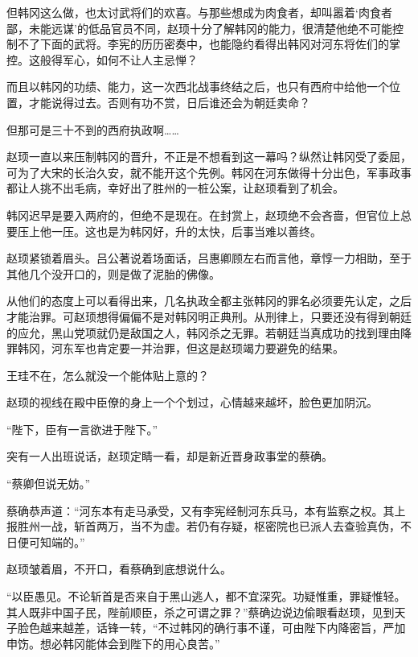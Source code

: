 但韩冈这么做，也太讨武将们的欢喜。与那些想成为肉食者，却叫嚣着‘肉食者鄙，未能远谋’的低品官员不同，赵顼十分了解韩冈的能力，很清楚他绝不可能控制不了下面的武将。李宪的历历密奏中，也能隐约看得出韩冈对河东将佐们的掌控。这般得军心，如何不让人主忌惮？

而且以韩冈的功绩、能力，这一次西北战事终结之后，也只有西府中给他一个位置，才能说得过去。否则有功不赏，日后谁还会为朝廷卖命？

但那可是三十不到的西府执政啊……

赵顼一直以来压制韩冈的晋升，不正是不想看到这一幕吗？纵然让韩冈受了委屈，可为了大宋的长治久安，就不能开这个先例。韩冈在河东做得十分出色，军事政事都让人挑不出毛病，幸好出了胜州的一桩公案，让赵顼看到了机会。

韩冈迟早是要入两府的，但绝不是现在。在封赏上，赵顼绝不会吝啬，但官位上总要压上他一压。这也是为韩冈好，升的太快，后事当难以善终。

赵顼紧锁着眉头。吕公著说着场面话，吕惠卿顾左右而言他，章惇一力相助，至于其他几个没开口的，则是做了泥胎的佛像。

从他们的态度上可以看得出来，几名执政全都主张韩冈的罪名必须要先认定，之后才能治罪。可赵顼想得偏偏不是对韩冈明正典刑。从刑律上，只要还没有得到朝廷的应允，黑山党项就仍是敌国之人，韩冈杀之无罪。若朝廷当真成功的找到理由降罪韩冈，河东军也肯定要一并治罪，但这是赵顼竭力要避免的结果。

王珪不在，怎么就没一个能体贴上意的？

赵顼的视线在殿中臣僚的身上一个个划过，心情越来越坏，脸色更加阴沉。

“陛下，臣有一言欲进于陛下。”

突有一人出班说话，赵顼定睛一看，却是新近晋身政事堂的蔡确。

“蔡卿但说无妨。”

蔡确恭声道：“河东本有走马承受，又有李宪经制河东兵马，本有监察之权。其上报胜州一战，斩首两万，当不为虚。若仍有存疑，枢密院也已派人去查验真伪，不日便可知端的。”

赵顼皱着眉，不开口，看蔡确到底想说什么。

“以臣愚见。不论斩首是否来自于黑山逃人，都不宜深究。功疑惟重，罪疑惟轻。其人既非中国子民，陛前顺臣，杀之可谓之罪？”蔡确边说边偷眼看赵顼，见到天子脸色越来越差，话锋一转，“不过韩冈的确行事不谨，可由陛下内降密旨，严加申饬。想必韩冈能体会到陛下的用心良苦。”

